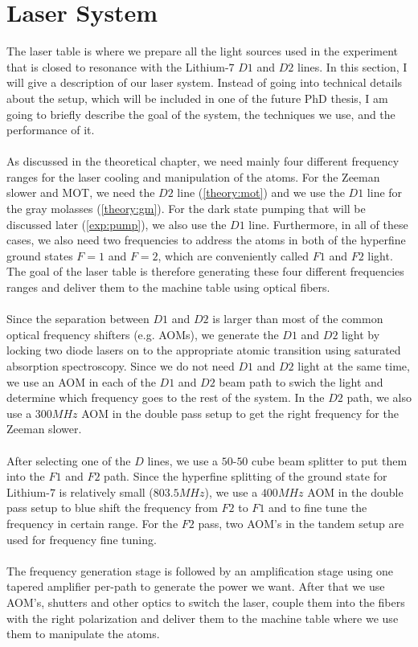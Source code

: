 \section{Laser System}\label{exp:laser-table}
The laser table is where we prepare all the light sources used in the experiment that is closed to resonance with the Lithium-$7$ $D1$ and $D2$ lines. In this section, I will give a description of our laser system. Instead of going into technical details about the setup, which will be included in one of the future PhD thesis, I am going to briefly describe the goal of the system, the techniques we use, and the performance of it.\\
\\
As discussed in the theoretical chapter, we need mainly four different frequency ranges for the laser cooling and manipulation of the atoms. For the Zeeman slower and MOT, we need the $D2$ line (\ref{theory:mot}) and we use the $D1$ line for the gray molasses (\ref{theory:gm}). For the dark state pumping that will be discussed later (\ref{exp:pump}), we also use the $D1$ line. Furthermore, in all of these cases, we also need two frequencies to address the atoms in both of the hyperfine ground states $F=1$ and $F=2$, which are conveniently called $F1$ and $F2$ light. The goal of the laser table is therefore generating these four different frequencies ranges and deliver them to the machine table using optical fibers.\\
\\
Since the separation between $D1$ and $D2$ is larger than most of the common optical frequency shifters (e.g. AOMs), we generate the $D1$ and $D2$ light by locking two diode lasers on to the appropriate atomic transition using saturated absorption spectroscopy. Since we do not need $D1$ and $D2$ light at the same time, we use an AOM in each of the $D1$ and $D2$ beam path to swich the light and determine which frequency goes to the rest of the system. In the $D2$ path, we also use a $300MHz$ AOM in the double pass setup to get the right frequency for the Zeeman slower.\\
\\
After selecting one of the $D$ lines, we use a $50$-$50$ cube beam splitter to put them into the $F1$ and $F2$ path. Since the hyperfine splitting of the ground state for Lithium-$7$ is relatively small ($803.5MHz$), we use a $400MHz$ AOM in the double pass setup to blue shift the frequency from $F2$ to $F1$ and to fine tune the frequency in certain range. For the $F2$ pass, two AOM's in the tandem setup are used for frequency fine tuning.\\
\\
The frequency generation stage is followed by an amplification stage using one tapered amplifier per-path to generate the power we want. After that we use AOM's, shutters and other optics to switch the laser, couple them into the fibers with the right polarization and deliver them to the machine table where we use them to manipulate the atoms.

